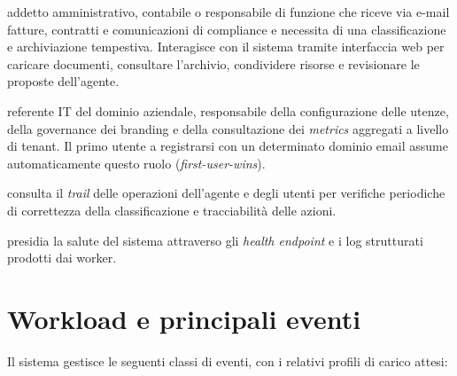 \begin{description}[leftmargin=*]
    \item[Utente finale (knowledge worker)] addetto amministrativo, contabile o
          responsabile di funzione che riceve via e-mail fatture, contratti e
          comunicazioni di compliance e necessita di una classificazione e
          archiviazione tempestiva. Interagisce con il sistema tramite interfaccia web
          per caricare documenti, consultare l'archivio, condividere risorse e revisionare
          le proposte dell'agente.

    \item[Domain administrator] referente IT del dominio aziendale, responsabile
          della configurazione delle utenze, della governance dei branding e
          della consultazione dei \emph{metrics} aggregati a livello di tenant.
          Il primo utente a registrarsi con un determinato dominio email assume
          automaticamente questo ruolo (\emph{first-user-wins}).

    \item[Auditor / Compliance officer] consulta il \emph{trail} delle
          operazioni dell'agente e degli utenti per verifiche periodiche di correttezza
          della classificazione e tracciabilit\`a delle azioni.

    \item[Operatore di piattaforma] presidia la salute del sistema attraverso
          gli \emph{health endpoint} e i log strutturati prodotti dai worker.
\end{description}

\section{Workload e principali eventi}
\label{sec:workload}

Il sistema gestisce le seguenti classi di eventi, con i relativi profili di carico attesi:

